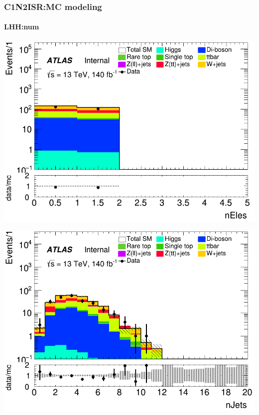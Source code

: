 \documentclass[usenames,dvipsnames]{beamer}
\begin{document}
\begin{frame}
\frametitle{C1N2ISR:MC modeling}
\framesubtitle{LHH:\quad num}
    \begin{minipage}{0.32\textwidth}
        \centering
        \includegraphics[width=\textwidth]{graphics/LHH_met/LHH_met_nEles.png}
    \end{minipage}
    \hfill
    \begin{minipage}{0.32\textwidth}
        \centering
        \includegraphics[width=\textwidth]{graphics/LHH_met/LHH_met_nJets.png}
    \end{minipage}
    \hfill
    \begin{minipage}{0.32\textwidth}
        \centering

\end{minipage}
\end{frame}
\end{document}
